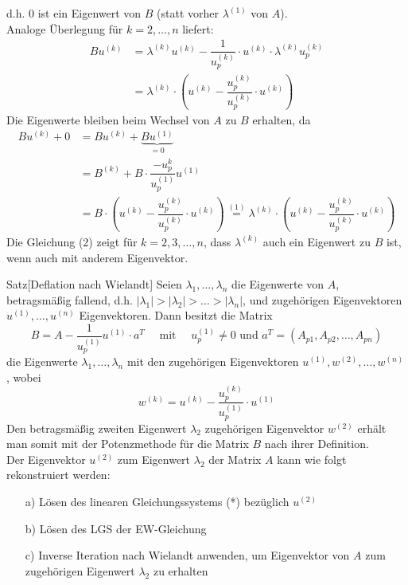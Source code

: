 d.h. $0$ ist ein Eigenwert von $B$  (statt vorher $\lambda^{(1)}$ von $A$).  \\
Analoge Überlegung für $k=2,\dotsc,n$ liefert:
\begin{align*}
    Bu^{(k)} &= \lambda^{(k)}u^{(k)} - \dfrac{1}{u^{(k)}_p} \cdot u^{(k)}\cdot \lambda^{(k)}u^{(k)}_p \\
    &= \lambda^{(k)}\cdot\left(u^{(k)} - \dfrac{u^{(k)}_p}{u^{(k)}_p} \cdot u^{(k)}\right) \tag{1}
\end{align*}
Die Eigenwerte bleiben beim Wechsel von $A$ zu $B$ erhalten, da 
\begin{align*}
    Bu^{(k)} + 0 &= Bu^{(k)} + \underbrace{Bu^{(1)}}_{=0} \\
    &= B^{(k)} + B\cdot\dfrac{-u_p^{k}}{u_p^{(1)}}u^{(1)} \\
    &= B\cdot\left(u^{(k)} - \dfrac{u^{(k)}_p}{u^{(k)}_p} \cdot u^{(k)}\right) 
    \stackrel{(1)}{=} \lambda^{(k)}\cdot\left(u^{(k)} - \dfrac{u^{(k)}_p}{u^{(k)}_p} \cdot u^{(k)}\right) \tag{2}
\end{align*}
Die Gleichung (2) zeigt für $k=2,3,\dotsc,n$, dass $\lambda^{(k)}$ auch ein Eigenwert zu $B$ ist, 
wenn auch mit anderem Eigenvektor. 
\begin{thmbox}{Satz}[Deflation nach Wielandt]
    Seien $\lambda_1,\dotsc,\lambda_n$ die Eigenwerte von $A$, betragsmäßig fallend, d.h. 
    $|\lambda_1|>|\lambda_2|>\dotsc>|\lambda_n|$, und zugehörigen Eigenvektoren $u^{(1)},\dotsc,u^{(n)}$ Eigenvektoren.
    Dann besitzt die Matrix 
    \[B = A - \dfrac{1}{u_p^{(1)}} u^{(1)}\cdot a^T\quad\text{ mit }\quad u_p^{(1)}\neq 0 
    \text{ und } a^T=(A_{p1},A_{p2},\dotsc,A_{pn})\]
    die Eigenwerte $\lambda_1,\dotsc,\lambda_n$ mit den zugehörigen Eigenvektoren $u^{(1)},w^{(2)},\dotsc,w^{(n)}$,
    wobei 
    \[w^{(k)} = u^{(k)} - \dfrac{u_p^{(k)}}{u_p^{(1)}}\cdot u^{(1)}\tag{*}\]
    Den betragsmäßig zweiten Eigenwert $\lambda_2$ zugehörigen Eigenvektor $w^{(2)}$ erhält man somit mit der 
    Potenzmethode für die Matrix $B$ nach ihrer Definition. \\ 
    Der Eigenvektor $u^{(2)}$ zum Eigenwert $\lambda_2$ der Matrix $A$ kann wie folgt rekonstruiert werden:
    \begin{enumerate}
        \item[a)] Lösen des linearen Gleichungssystems (*) bezüglich $u^{(2)}$ 
        \item[b)] Lösen des LGS der EW-Gleichung  
        \item[c)] Inverse Iteration nach Wielandt anwenden, um Eigenvektor von $A$ zum zugehörigen Eigenwert
        $\lambda_2$ zu erhalten 
    \end{enumerate}
\end{thmbox}
